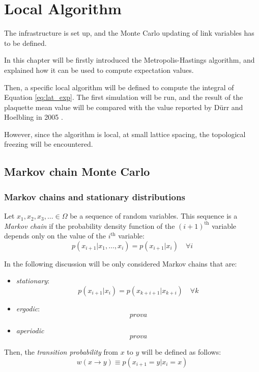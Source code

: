 \chapter{Local Algorithm}\label{ch:local}

The infrastructure is set up, and the Monte Carlo updating of link variables has to be defined.

In this chapter will be firstly introduced the Metropolis-Hastings algorithm,
and explained how it can be used to compute expectation values.

Then, a specific local algorithm will be defined to compute the integral of Equation \eqref{eq:lat_exp}.
The first simulation will be run,
and the result of the plaquette mean value will be compared with the value reported by D\"urr and Hoelbling in 2005 \cite{durr-hoelbling:2005}.

However, since the algorithm is local, at small lattice spacing, the topological freezing will be encountered.

\section{Markov chain Monte Carlo}

\subsection*{Markov chains and stationary distributions}
Let $x_1, x_2, x_3, \ldots \in \Omega$ be a sequence of random variables.
This sequence is a \emph{Markov chain} if the probability density function of the $(i+1)^\mathrm{th}$
variable depends only on the value of the $i^\mathrm{th}$ variable:
\[
	p(x_{i+1}|x_1, \ldots, x_i) = p(x_{i+1}|x_i) \quad \forall i
\]

In the following discussion will be only considered Markov chains that are:
\begin{itemize}
    \item \emph{stationary}:
        \[
            p(x_{i+1}|x_i) = p(x_{k+i+1}|x_{k+i}) \quad \forall k
        \]
    \item \emph{ergodic}:
        \[
            prova
        \]
    \item \emph{aperiodic}
        \[
            prova
        \]
\end{itemize}

Then, the \emph{transition probability} from $x$ to $y$ will be defined as follows:
\[
    w(x \to y) \equiv p(x_{i+1}=y|x_i=x)
\]

